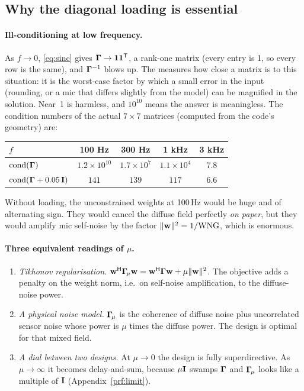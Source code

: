 \documentclass[11pt]{article}
\begin{document}
\subsection{Why the diagonal loading is essential}\label{sec:loading}

\paragraph{Ill-conditioning at low frequency.} As $f\to0$, \eqref{eq:sinc} gives
$\bm{\Gamma}\to\mathbf{1}\mathbf{1}^{\mathsf T}$, a rank-one matrix (every entry is 1, so every row is the same), and $\bm{\Gamma}^{-1}$
blows up. The  measures how close a matrix is to this situation: it
is the worst-case factor by which a small error in the input (rounding, or a mic that differs
slightly from the model) can be magnified in the solution. Near~1 is harmless, and
$10^{10}$ means the answer is meaningless. The condition numbers of the actual $7\times7$
matrices (computed from the code's geometry) are:

\begin{center}\small
\begin{tabular}{@{}lcccc@{}}
\toprule
$f$ & 100 Hz & 300 Hz & 1 kHz & 3 kHz\\
\midrule
$\operatorname{cond}(\bm{\Gamma})$ & $1.2\times10^{10}$ & $1.7\times10^{7}$ & $1.1\times10^{4}$ & $7.8$\\
$\operatorname{cond}(\bm{\Gamma}+0.05\,\mathbf{I})$ & $141$ & $139$ & $117$ & $6.6$\\
\bottomrule
\end{tabular}
\end{center}

\noindent
Without loading, the unconstrained weights at 100\,Hz would be huge and of alternating sign.
They would cancel the diffuse field perfectly \emph{on paper}, but they would amplify mic
self-noise by the factor $\|\mathbf{w}\|^2=1/\mathrm{WNG}$, which is enormous.

\paragraph{Three equivalent readings of $\mu$.}
\begin{enumerate}
\item \emph{Tikhonov regularisation.} $\mathbf{w}^{\mathsf H}\bm{\Gamma}_{\!\mu}\mathbf{w}=\mathbf{w}^{\mathsf H}\bm{\Gamma}\mathbf{w}+\mu\|\mathbf{w}\|^2$. The
  objective adds a penalty on the weight norm, i.e.\ on self-noise amplification, to the
  diffuse-noise power.
\item \emph{A physical noise model.} $\bm{\Gamma}_{\!\mu}$ is the coherence of diffuse noise plus uncorrelated
  sensor noise whose power is $\mu$ times the diffuse power. The design is optimal for that mixed
  field.
\item \emph{A dial between two designs.} At $\mu\to0$ the design is fully superdirective. As
  $\mu\to\infty$ it becomes delay-and-sum, because $\mu\mathbf{I}$ swamps $\bm{\Gamma}$ and $\bm{\Gamma}_{\!\mu}$ looks like a
  multiple of $\mathbf{I}$ (Appendix~\ref{prf:limit}).
\end{enumerate}
\end{document}
